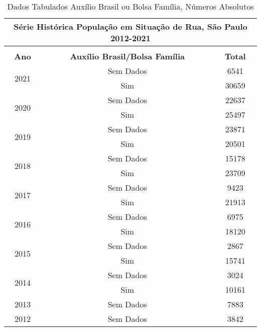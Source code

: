 \documentclass[14pt]{extarticle}
\begin{document}
\begin{table}[htbp]
  \centering
  \caption{Dados Tabulados Auxílio Brasil ou Bolsa Família, Números Absolutos}
  \tabcolsep=0.15cm
	\renewcommand{\arraystretch}{1.0}
	\begin{adjustbox}{max width=\linewidth}
    \begin{tabular}{ccc}
    \toprule
    \multicolumn{3}{c}{Série Histórica População em Situação de Rua, São Paulo 2012-2021} \\
    \midrule
         &      &  \\
    \midrule
    \rowcolor[rgb]{ .906,  .902,  .902} \textbf{Ano} & \textbf{Auxílio Brasil/Bolsa Família} & \textbf{Total} \\
    \midrule
    \multirow{2}[2]{*}{2021} & Sem Dados & 6541 \\
         & Sim  & 30659 \\
    \midrule
    \multirow{2}[2]{*}{2020} & Sem Dados & 22637 \\
         & Sim  & 25497 \\
    \midrule
    \multirow{2}[2]{*}{2019} & Sem Dados & 23871 \\
         & Sim  & 20501 \\
    \midrule
    \multirow{2}[2]{*}{2018} & Sem Dados & 15178 \\
         & Sim  & 23709 \\
    \midrule
    \multirow{2}[2]{*}{2017} & Sem Dados & 9423 \\
         & Sim  & 21913 \\
    \midrule
    \multirow{2}[2]{*}{2016} & Sem Dados & 6975 \\
         & Sim  & 18120 \\
    \midrule
    \multirow{2}[2]{*}{2015} & Sem Dados & 2867 \\
         & Sim  & 15741 \\
    \midrule
    \multirow{2}[2]{*}{2014} & Sem Dados & 3024 \\
         & Sim  & 10161 \\
    \midrule
    2013 & Sem Dados & 7883 \\
    \midrule
    2012 & Sem Dados & 3842 \\
    \bottomrule
    \end{tabular}%
    \end{adjustbox}
  \label{tab:tab_bolsa_familia2}%
\end{table}%
\end{document}
